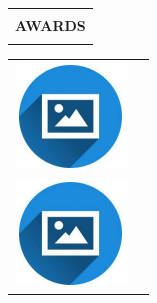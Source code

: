 \documentclass{article}
\makeatletter
\newcommand{\cvsection}[1]{
\setlength{\arrayrulewidth}{1pt}
\begin{tabular}{@{}p{\linewidth}}
 \\
\\
\textbf{\Large #1}  \\[3pt]
\hline
 \\
\end{tabular}
}
\makeatother
\begin{document}
\begin{paracol}{2}
\cvsection{AWARDS}

\begin{tabular}{@{}ll}
\begin{minipage}{0.09\linewidth}
         \includegraphics[width=\linewidth]{picon.png}
         \end{minipage} & {\color{maincolor}{awards.[0].issuer}} \\[8pt]
\begin{minipage}{0.09\linewidth}
         \includegraphics[width=\linewidth]{picon.png}
         \end{minipage} & {\color{maincolor}{awards.[1].issuer}} \\
\end{tabular}

\end{paracol}
\end{document}
